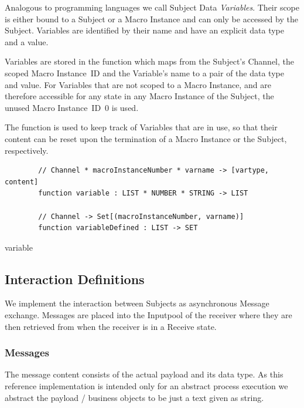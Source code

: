 
Analogous to programming languages we call Subject Data \textit{Variables}.
Their scope is either bound to a Subject or a Macro Instance and can only be
accessed by the Subject. Variables are identified by their name and have an
explicit data type and a value.

Variables are stored in the  function which maps from
the Subject's Channel, the scoped Macro Instance~ID and the Variable's name to
a pair of the data type and value. For Variables that are not scoped to a Macro
Instance, and are therefore accessible for any state in any Macro Instance of
the Subject, the unused Macro Instance~ID~0 is used.

The function  is used to keep track of Variables
that are in use, so that their content can be reset upon the termination of a
Macro Instance or the Subject, respectively.

\begin{listing}[H]
	\begin{verbatim}
		// Channel * macroInstanceNumber * varname -> [vartype, content]
		function variable : LIST * NUMBER * STRING -> LIST
		
		// Channel -> Set[(macroInstanceNumber, varname)]
		function variableDefined : LIST -> SET
	\end{verbatim}
	\caption{variable}
	\label{lst:shortasm:variable}
\end{listing}

\subsection{Interaction Definitions}\label{sec:InteractionDefinitions}

We implement the interaction between Subjects as asynchronous Message exchange.
Messages are placed into the Inputpool of the receiver where they are then retrieved from when the receiver is in a Receive state.

\subsubsection{Messages}\label{sec:messages}

The message content consists of the actual payload and its data type. As this
reference implementation is intended only for an abstract process execution we abstract
the payload / business objects to be just a text given as string.

